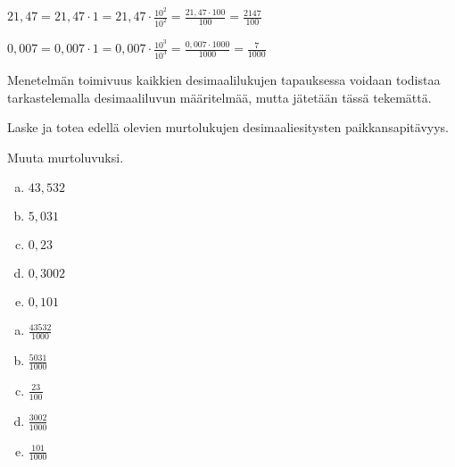 \begin{esimerkki}
$21,47 = 21,47 \cdot 1 = 21,47 \cdot \frac{10^2}{10^2} = \frac{21,47 \cdot 100}{100} = \frac{2147}{100}$
\end{esimerkki}

\begin{esimerkki}
$0,007 = 0,007 \cdot 1 = 0,007 \cdot \frac{10^3}{10^3} = \frac{0,007 \cdot 1000}{1000} = \frac{7}{1000}$
\end{esimerkki}

Menetelmän toimivuus kaikkien desimaalilukujen tapauksessa voidaan todistaa tarkastelemalla desimaaliluvun määritelmää, mutta jätetään tässä tekemättä.


\begin{tehtava}
Laske ja totea edellä olevien murtolukujen desimaaliesitysten paikkansapitävyys.
\end{tehtava}

\begin{tehtava}
Muuta murtoluvuksi.
	\begin{enumerate}[a)]
		\item $43,532$
		\item $5,031$
		\item $0,23$
		\item $0,3002$
		\item $0,101$
	\end{enumerate}
\begin{vastaus}
	\begin{enumerate}[a)]
		\item $ \frac{43532}{1000}$
		\item $ \frac{5031}{1000}$
		\item $ \frac{23}{100}$
		\item $ \frac{3002}{1000}$
		\item $ \frac{101}{1000}$
	\end{enumerate}
\end{vastaus}
\end{tehtava}

